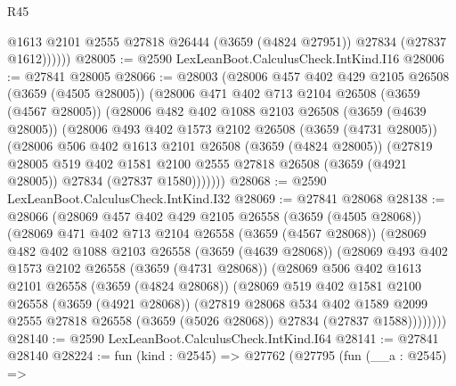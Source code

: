 \begin{lexlean}{R45}
\begin{coremodule}
              @1613
              @2101
              @2555
              @27818
              @26444
              (@3659 (@4824 @27951))
              @27834
              (@27837 @1612))))))
@28005 := @2590 LexLeanBoot.CalculusCheck.IntKind.I16
@28006 := @27841 @28005
@28066 := @28003
    (@28006
      @457
      @402
      @429
      @2105
      @26508
      (@3659 (@4505 @28005))
      (@28006
        @471
        @402
        @713
        @2104
        @26508
        (@3659 (@4567 @28005))
        (@28006
          @482
          @402
          @1088
          @2103
          @26508
          (@3659 (@4639 @28005))
          (@28006
            @493
            @402
            @1573
            @2102
            @26508
            (@3659 (@4731 @28005))
            (@28006
              @506
              @402
              @1613
              @2101
              @26508
              (@3659 (@4824 @28005))
              (@27819
                @28005
                @519
                @402
                @1581
                @2100
                @2555
                @27818
                @26508
                (@3659 (@4921 @28005))
                @27834
                (@27837 @1580)))))))
@28068 := @2590 LexLeanBoot.CalculusCheck.IntKind.I32
@28069 := @27841 @28068
@28138 := @28066
    (@28069
      @457
      @402
      @429
      @2105
      @26558
      (@3659 (@4505 @28068))
      (@28069
        @471
        @402
        @713
        @2104
        @26558
        (@3659 (@4567 @28068))
        (@28069
          @482
          @402
          @1088
          @2103
          @26558
          (@3659 (@4639 @28068))
          (@28069
            @493
            @402
            @1573
            @2102
            @26558
            (@3659 (@4731 @28068))
            (@28069
              @506
              @402
              @1613
              @2101
              @26558
              (@3659 (@4824 @28068))
              (@28069
                @519
                @402
                @1581
                @2100
                @26558
                (@3659 (@4921 @28068))
                (@27819
                  @28068
                  @534
                  @402
                  @1589
                  @2099
                  @2555
                  @27818
                  @26558
                  (@3659 (@5026 @28068))
                  @27834
                  (@27837 @1588))))))))
@28140 := @2590 LexLeanBoot.CalculusCheck.IntKind.I64
@28141 := @27841 @28140
@28224 := fun (kind : @2545) =>
  @27762
    (@27795
      (fun (__a : @2545) =>

\end{coremodule}
\end{lexlean}
